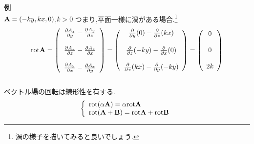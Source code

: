 \documentclass{jsarticle}
\begin{document}
{\bf 例} \\
${\bf A} = (-ky,kx,0)$,$k>0$ つまり,平面一様に渦がある場合.\footnote{渦の様子を描いてみると良いでしょう.} 
\begin{eqnarray}
{\rm rot}{\bf A} =  
\left( 
\begin{array}{cc}
\frac{\partial A_z}{\partial y}-\frac{\partial A_y}{\partial z}\\
\\
\frac{\partial A_x}{\partial z}-\frac{\partial A_z}{\partial x}\\
\\
\frac{\partial A_y}{\partial x}-\frac{\partial A_x}{\partial y}\\
\end{array}
\right)
=
\left( 
\begin{array}{cc}
\frac{\partial}{\partial y}(0)-\frac{\partial}{\partial z}(kx)\\
\\
\frac{\partial}{\partial z}(-ky)-\frac{\partial}{\partial x}(0)\\
\\
\frac{\partial}{\partial x}(kx)-\frac{\partial}{\partial y}(-ky)\\
\end{array}
\right)
=
\left( 
\begin{array}{cc}
0 \\
\\
0 \\
\\
2k \\
\end{array}
\right)
\end{eqnarray}
\\
ベクトル場の回転は線形性を有する.
\begin{equation}
\left \{
\begin{array}{l}
{\rm rot}(\alpha {\bf A}) = \alpha {\rm rot}{\bf A} \\
{\rm rot}({\bf A}+{\bf B}) = {\rm rot}{\bf A} + {\rm rot}{\bf B}
\end{array}
\right.
\end{equation}
\end{document}
